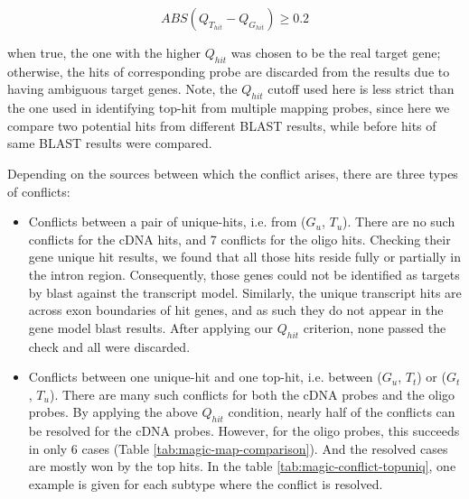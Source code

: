 \begin{equation}
ABS(Q_{T_{hit}}-Q_{G_{hit}}) \geq 0.2
\end{equation}

when true, the one with the higher $Q_{hit}$ was chosen to be the real target 
gene; 
otherwise, the hits of corresponding probe are discarded from the results due 
to having ambiguous target genes. 
Note, the $Q_{hit}$ cutoff used here is less strict than the one used in 
identifying top-hit from multiple mapping probes, since here we compare two 
potential hits from different BLAST results, while before hits of same BLAST 
results were compared.

Depending on the sources between which the conflict arises, there are three 
types of conflicts:

\begin{itemize}
\item Conflicts between a pair of unique-hits, i.e. from ($G_u$, $T_u$). There 
are no such conflicts for the cDNA hits, and 7 conflicts for the oligo hits. 
Checking their gene unique hit results, we found that all those hits reside 
fully or partially in the intron region. 
Consequently, those genes could not be identified as targets by blast against 
the transcript model. 
Similarly, the unique transcript hits are across exon boundaries of hit genes, 
and as such they do not appear in the gene model blast results. 
After applying our $Q_{hit}$ criterion, none passed the check and all  
were discarded. 

\item  Conflicts between one unique-hit and one top-hit, i.e. between ($G_u$, 
$T_t$) or ($G_t$, $T_u$). 
There are many such conflicts for both the cDNA probes and the oligo probes. 
By applying the above $Q_{hit}$ condition, nearly half of the conflicts can be 
resolved for the cDNA probes. 
However, for the oligo probes, this succeeds in only 6 cases (Table 
\ref{tab:magic-map-comparison}).
And the resolved cases are mostly won by the top hits.
In the table \ref{tab:magic-conflict-topuniq}, one example is given for each 
subtype where the conflict is resolved. 



\end{itemize}
